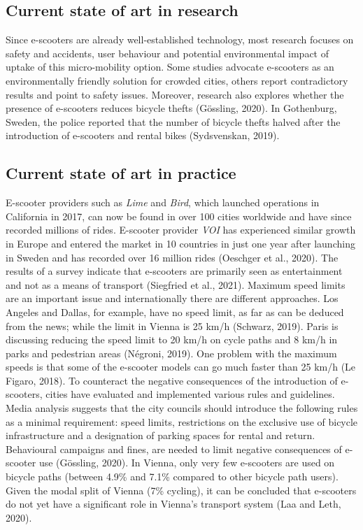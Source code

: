 \documentclass[
]{book}
\begin{document}
\hypertarget{current-state-of-art-in-research-33}{%
\subsection*{Current state of art in research}\label{current-state-of-art-in-research-33}}

Since e-scooters are already well-established technology, most research focuses on safety and accidents, user behaviour and potential environmental impact of uptake of this micro-mobility option. Some studies advocate e-scooters as an environmentally friendly solution for crowded cities, others report contradictory results and point to safety issues.
Moreover, research also explores whether the presence of e-scooters reduces bicycle thefts (Gössling, 2020). In Gothenburg, Sweden, the police reported that the number of bicycle thefts halved after the introduction of e-scooters and rental bikes (Sydsvenskan, 2019).

\hypertarget{current-state-of-art-in-practice-32}{%
\subsection*{Current state of art in practice}\label{current-state-of-art-in-practice-32}}

E-scooter providers such as \emph{Lime} and \emph{Bird}, which launched operations in California in 2017, can now be found in over 100 cities worldwide and have since recorded millions of rides. E-scooter provider \emph{VOI} has experienced similar growth in Europe and entered the market in 10 countries in just one year after launching in Sweden and has recorded over 16 million rides (Oeschger et al., 2020). The results of a survey indicate that e-scooters are primarily seen as entertainment and not as a means of transport (Siegfried et al., 2021).
Maximum speed limits are an important issue and internationally there are different approaches. Los Angeles and Dallas, for example, have no speed limit, as far as can be deduced from the news; while the limit in Vienna is 25 km/h (Schwarz, 2019). Paris is discussing reducing the speed limit to 20 km/h on cycle paths and 8 km/h in parks and pedestrian areas (Négroni, 2019). One problem with the maximum speeds is that some of the e-scooter models can go much faster than 25 km/h (Le Figaro, 2018). To counteract the negative consequences of the introduction of e-scooters, cities have evaluated and implemented various rules and guidelines. Media analysis suggests that the city councils should introduce the following rules as a minimal requirement: speed limits, restrictions on the exclusive use of bicycle infrastructure and a designation of parking spaces for rental and return. Behavioural campaigns and fines, are needed to limit negative consequences of e-scooter use (Gössling, 2020).
In Vienna, only very few e-scooters are used on bicycle paths (between 4.9\% and 7.1\% compared to other bicycle path users). Given the modal split of Vienna (7\% cycling), it can be concluded that e-scooters do not yet have a significant role in Vienna's transport system (Laa and Leth, 2020).
\end{document}
